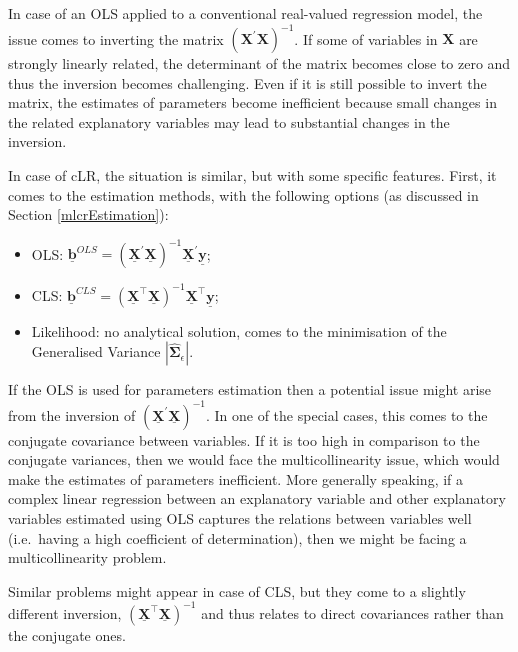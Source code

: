 \documentclass[
]{book}
\providecommand{\tightlist}{%
  \setlength{\itemsep}{0pt}\setlength{\parskip}{0pt}}
\begin{document}
In case of an OLS applied to a conventional real-valued regression model, the issue comes to inverting the matrix \(\left( {\mathbf{X}}^\prime {\mathbf{X}} \right)^{-1}\). If some of variables in \(\mathbf{X}\) are strongly linearly related, the determinant of the matrix becomes close to zero and thus the inversion becomes challenging. Even if it is still possible to invert the matrix, the estimates of parameters become inefficient because small changes in the related explanatory variables may lead to substantial changes in the inversion.

In case of cLR, the situation is similar, but with some specific features. First, it comes to the estimation methods, with the following options (as discussed in Section \ref{mlcrEstimation}):

\begin{itemize}
\tightlist
\item
  OLS: \(\underline{\boldsymbol{b}}^{OLS} = \left( \underline{\mathbf{X}}^\prime \underline{\mathbf{X}} \right)^{-1} \underline{\mathbf{X}}^\prime \underline{\mathbf{y}}\);
\item
  CLS: \(\underline{\boldsymbol{b}}^{CLS} = \left( \underline{\mathbf{X}}^\top \underline{\mathbf{X}}\right)^{-1} \underline{\mathbf{X}}^\top \underline{\mathbf{y}}\);
\item
  Likelihood: no analytical solution, comes to the minimisation of the Generalised Variance \(|\hat{\boldsymbol{\Sigma}}_\epsilon|\).
\end{itemize}

If the OLS is used for parameters estimation then a potential issue might arise from the inversion of \(\left( \underline{\mathbf{X}}^\prime \underline{\mathbf{X}}\right)^{-1}\). In one of the special cases, this comes to the conjugate covariance between variables. If it is too high in comparison to the conjugate variances, then we would face the multicollinearity issue, which would make the estimates of parameters inefficient. More generally speaking, if a complex linear regression between an explanatory variable and other explanatory variables estimated using OLS captures the relations between variables well (i.e.~having a high coefficient of determination), then we might be facing a multicollinearity problem.

Similar problems might appear in case of CLS, but they come to a slightly different inversion, \(\left( \underline{\mathbf{X}}^\top \underline{\mathbf{X}}\right)^{-1}\) and thus relates to direct covariances rather than the conjugate ones.
\end{document}

